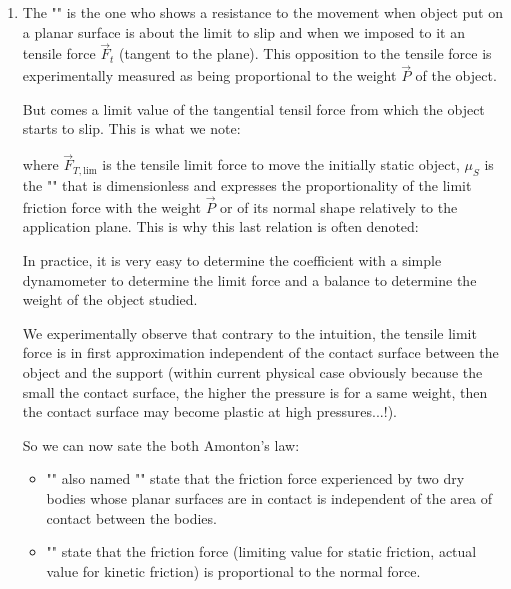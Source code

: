 	\begin{enumerate}
		\item The "" is the one who shows a resistance to the movement when object put on a planar surface is about the limit to slip and when we imposed to it an tensile force $\vec{F}_t$ (tangent to the plane). This opposition to the tensile force is experimentally measured as being proportional to the weight $\vec{P}$ of the object.

		But comes a limit value of the tangential tensil force from which the object starts to slip. This is what we note:
		
		where $\vec{F}_{T,\text{lim}}$ is the tensile limit force to move the initially static object, $\mu_S$ is the "" that is dimensionless and expresses the proportionality of the limit  friction force with the weight $\vec{P}$ or of its normal shape relatively to the application plane. This is why this last relation is often denoted:
		
		\begin{tcolorbox}[title=Remark,colframe=black,arc=10pt]
		In practice, it is very easy to determine the coefficient with a simple dynamometer to determine the limit force and a balance to determine the weight of the object studied.
		\end{tcolorbox}
		We experimentally observe that contrary to the intuition, the tensile limit force is in first approximation independent of the contact surface between the object and the support (within current physical case obviously because the small the contact surface, the higher the pressure is for a same weight, then the contact surface may become plastic at high pressures...!).
		
		So we can now sate the both Amonton's law:
		\begin{itemize}
			\item "" also named "" state that the friction force experienced by two dry bodies whose planar surfaces are in contact is independent of the area of contact between the bodies.
			
			\item "" state that the friction force (limiting value for static friction, actual value for kinetic friction) is proportional to the normal force.
		\end{itemize}
		

\end{enumerate}
